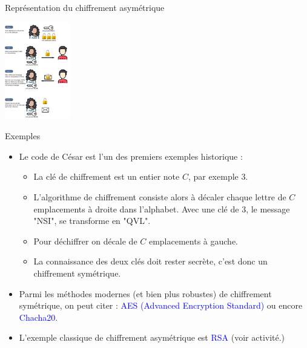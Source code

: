 \documentclass[10pt]{beamer}
\begin{document}
\begin{frame}
	\mframe{\SC}
	\begin{block}{Représentation du chiffrement asymétrique}
		\begin{center}
		\includegraphics[height=160px]{asym.png}
		\end{center}
	\end{block}
\end{frame}


\begin{frame}
	\mframe{\SC}
	\begin{exampleblock}{Exemples}
		\begin{itemize}[label=\textbullet]
		\item<1-> Le code de César est l'un des premiers exemples historique :
		\begin{itemize}[label=\textbullet]
			\item<2-> La clé de chiffrement est un entier note $C$, par exemple 3.
			\item<3-> L'algorithme de chiffrement consiste alors à décaler chaque lettre de $C$ emplacements à droite dans l'alphabet. Avec une clé de 3, le message "NSI", se transforme  en "QVL".
			\item<4-> Pour déchiffrer on décale de $C$ emplacements à gauche.
			\item<5-> La connaissance des deux clés doit rester secrète, c'est donc un chiffrement symétrique.
		\end{itemize}
		\item<6-> Parmi les méthodes modernes (et bien plus robustes) de chiffrement symétrique, on peut citer : \textcolor{blue}{AES (Advanced Encryption Standard)} ou encore \textcolor{blue}{Chacha20}.
		\item<7-> L'exemple classique de chiffrement asymétrique est \textcolor{blue}{RSA} (voir activité.)
	\end{itemize}
	\end{exampleblock}
\end{frame}
\end{document}
